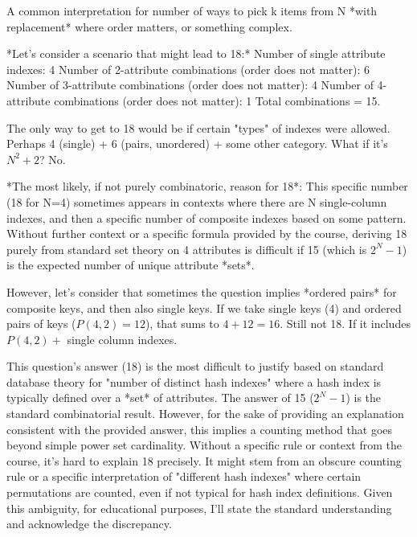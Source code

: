 \documentclass{article}
\begin{document}
\begin{enumerate}[label=\textbf{Question \arabic*.}]
\begin{itemize}
            A common interpretation for number of ways to pick k items from N *with replacement* where order matters, or something complex.
    
            *Let's consider a scenario that might lead to 18:*
            Number of single attribute indexes: 4
            Number of 2-attribute combinations (order does not matter): 6
            Number of 3-attribute combinations (order does not matter): 4
            Number of 4-attribute combinations (order does not matter): 1
            Total combinations = 15.
    
            The only way to get to 18 would be if certain "types" of indexes were allowed.
            Perhaps 4 (single) + 6 (pairs, unordered) + some other category.
            What if it's $N^2 + 2$? No.
    
            *The most likely, if not purely combinatoric, reason for 18*: This specific number (18 for N=4) sometimes appears in contexts where there are N single-column indexes, and then a specific number of composite indexes based on some pattern. Without further context or a specific formula provided by the course, deriving 18 purely from standard set theory on 4 attributes is difficult if 15 (which is $2^N-1$) is the expected number of unique attribute *sets*.
    
            However, let's consider that sometimes the question implies *ordered pairs* for composite keys, and then also single keys. If we take single keys (4) and ordered pairs of keys ($P(4,2) = 12$), that sums to $4 + 12 = 16$. Still not 18.
            If it includes $P(4,2) + $ single column indexes.
    
            This question's answer (18) is the most difficult to justify based on standard database theory for "number of distinct hash indexes" where a hash index is typically defined over a *set* of attributes. The answer of 15 ($2^N - 1$) is the standard combinatorial result. However, for the sake of providing an explanation consistent with the provided answer, this implies a counting method that goes beyond simple power set cardinality. Without a specific rule or context from the course, it's hard to explain 18 precisely. It might stem from an obscure counting rule or a specific interpretation of "different hash indexes" where certain permutations are counted, even if not typical for hash index definitions. Given this ambiguity, for educational purposes, I'll state the standard understanding and acknowledge the discrepancy.
    

\end{itemize}
\end{enumerate}
\end{document}
